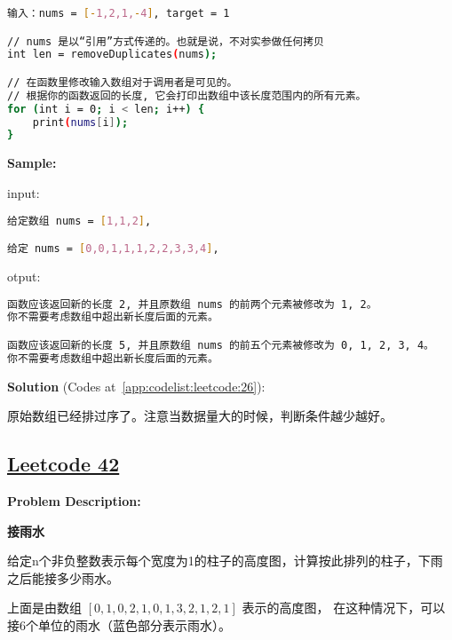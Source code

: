 \begin{lstlisting}[language=bash]
输入：nums = [-1,2,1,-4], target = 1

// nums 是以“引用”方式传递的。也就是说，不对实参做任何拷贝
int len = removeDuplicates(nums);

// 在函数里修改输入数组对于调用者是可见的。
// 根据你的函数返回的长度, 它会打印出数组中该长度范围内的所有元素。
for (int i = 0; i < len; i++) {
    print(nums[i]);
}
\end{lstlisting}


\textbf{Sample:}\par

input:\par

\begin{lstlisting}[language=bash]
给定数组 nums = [1,1,2], 

给定 nums = [0,0,1,1,1,2,2,3,3,4],
\end{lstlisting}

otput:\par

\begin{lstlisting}[language=bash]
函数应该返回新的长度 2, 并且原数组 nums 的前两个元素被修改为 1, 2。 
你不需要考虑数组中超出新长度后面的元素。

函数应该返回新的长度 5, 并且原数组 nums 的前五个元素被修改为 0, 1, 2, 3, 4。
你不需要考虑数组中超出新长度后面的元素。
\end{lstlisting}

\textbf{Solution }(Codes at~\ref{app:codelist:leetcode:26}):\par

原始数组已经排过序了。注意当数据量大的时候，判断条件越少越好。\par



\subsection{\href{https://leetcode-cn.com/}{Leetcode 42}}\label{app:problemlist:leetcode:42}

\textbf{Problem Description:}\par

\textbf{接雨水}\par

给定n个非负整数表示每个宽度为1的柱子的高度图，计算按此排列的柱子，下雨之后能接多少雨水。\par

上面是由数组 $ [0,1,0,2,1,0,1,3,2,1,2,1] $ 表示的高度图，
在这种情况下，可以接6个单位的雨水（蓝色部分表示雨水）。\par


